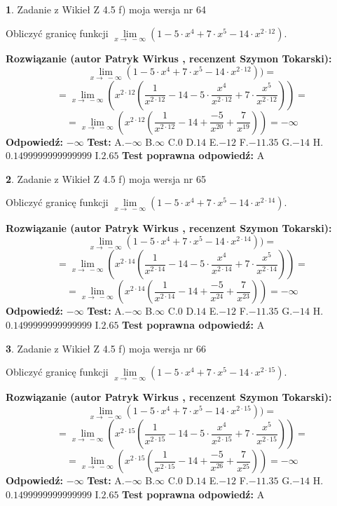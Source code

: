 \documentclass[12pt, a4paper]{article}
\theoremstyle{definition} %
\newtheorem{zad}{}
\newcommand{\zadStart}[1]{\begin{zad}#1\newline}
\newcommand{\zadStop}{\end{zad}}
\newcommand{\rozwStart}[2]{\noindent \textbf{Rozwiązanie (autor #1 , recenzent #2): }\newline}
\newcommand{\rozwStop}{\newline}
\newcommand{\odpStart}{\noindent \textbf{Odpowiedź:}\newline}
\newcommand{\odpStop}{\newline}
\newcommand{\testStart}{\noindent \textbf{Test:}\newline}
\newcommand{\testStop}{\newline}
\newcommand{\kluczStart}{\noindent \textbf{Test poprawna odpowiedź:}\newline}
\newcommand{\kluczStop}{\newline}
\begin{document}
\zadStart{Zadanie z Wikieł Z 4.5 f) moja wersja nr 64}


Obliczyć granicę funkcji  $\lim\limits_{x\to\ -\infty}(1 - 5 \cdot x^{4}+7 \cdot x^{5}- 14 \cdot x^{2\cdot12})$.
\zadStop
\rozwStart{Patryk Wirkus}{Szymon Tokarski}
$$\lim\limits_{x\to\ -\infty}(1 - 5 \cdot x^{4}+7 \cdot x^{5}- 14 \cdot x^{2\cdot12}))=$$
$$=\lim\limits_{x\to\ -\infty}(x^{2\cdot12}(\frac{1}{x^{2\cdot12}}-14 -5 \cdot \frac{x^{4}}{x^{2\cdot12}}+7 \cdot \frac{x^{5}}{x^{2\cdot12}}))=$$
$$=\lim\limits_{x\to\ -\infty}(x^{2\cdot12}(\frac{1}{x^{2\cdot12}}-14 + \frac{-5}{x^{20}}+ \frac{7}{x^{19}}))=-\infty$$
\rozwStop
\odpStart
$-\infty$
\odpStop
\testStart
A.$-\infty$ B.$\infty$ C.$0$ D.$14$ E.$-12$
F.$-11.35$ G.$-14$
H.$0.1499999999999999$
I.$2.65$
\testStop
\kluczStart
A
\kluczStop



\zadStart{Zadanie z Wikieł Z 4.5 f) moja wersja nr 65}


Obliczyć granicę funkcji  $\lim\limits_{x\to\ -\infty}(1 - 5 \cdot x^{4}+7 \cdot x^{5}- 14 \cdot x^{2\cdot14})$.
\zadStop
\rozwStart{Patryk Wirkus}{Szymon Tokarski}
$$\lim\limits_{x\to\ -\infty}(1 - 5 \cdot x^{4}+7 \cdot x^{5}- 14 \cdot x^{2\cdot14}))=$$
$$=\lim\limits_{x\to\ -\infty}(x^{2\cdot14}(\frac{1}{x^{2\cdot14}}-14 -5 \cdot \frac{x^{4}}{x^{2\cdot14}}+7 \cdot \frac{x^{5}}{x^{2\cdot14}}))=$$
$$=\lim\limits_{x\to\ -\infty}(x^{2\cdot14}(\frac{1}{x^{2\cdot14}}-14 + \frac{-5}{x^{24}}+ \frac{7}{x^{23}}))=-\infty$$
\rozwStop
\odpStart
$-\infty$
\odpStop
\testStart
A.$-\infty$ B.$\infty$ C.$0$ D.$14$ E.$-12$
F.$-11.35$ G.$-14$
H.$0.1499999999999999$
I.$2.65$
\testStop
\kluczStart
A
\kluczStop



\zadStart{Zadanie z Wikieł Z 4.5 f) moja wersja nr 66}


Obliczyć granicę funkcji  $\lim\limits_{x\to\ -\infty}(1 - 5 \cdot x^{4}+7 \cdot x^{5}- 14 \cdot x^{2\cdot15})$.
\zadStop
\rozwStart{Patryk Wirkus}{Szymon Tokarski}
$$\lim\limits_{x\to\ -\infty}(1 - 5 \cdot x^{4}+7 \cdot x^{5}- 14 \cdot x^{2\cdot15}))=$$
$$=\lim\limits_{x\to\ -\infty}(x^{2\cdot15}(\frac{1}{x^{2\cdot15}}-14 -5 \cdot \frac{x^{4}}{x^{2\cdot15}}+7 \cdot \frac{x^{5}}{x^{2\cdot15}}))=$$
$$=\lim\limits_{x\to\ -\infty}(x^{2\cdot15}(\frac{1}{x^{2\cdot15}}-14 + \frac{-5}{x^{26}}+ \frac{7}{x^{25}}))=-\infty$$
\rozwStop
\odpStart
$-\infty$
\odpStop
\testStart
A.$-\infty$ B.$\infty$ C.$0$ D.$14$ E.$-12$
F.$-11.35$ G.$-14$
H.$0.1499999999999999$
I.$2.65$
\testStop
\kluczStart
A
\kluczStop
\end{document}
